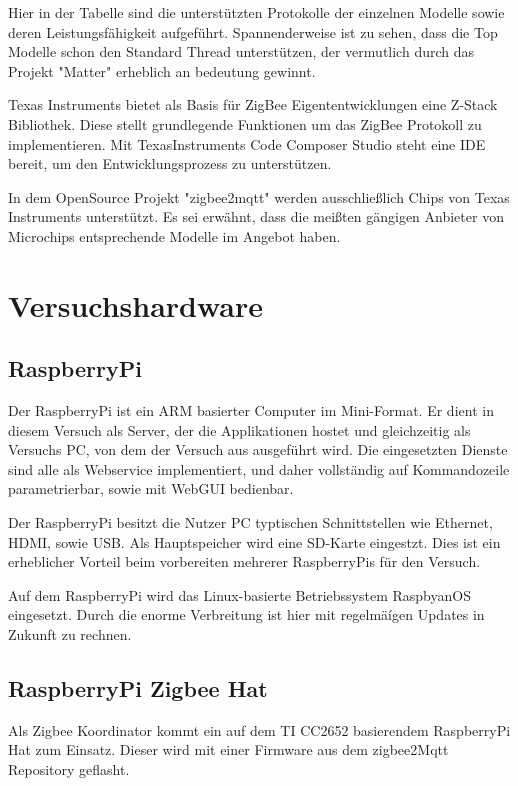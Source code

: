 Hier in der Tabelle sind die unterstützten Protokolle der einzelnen Modelle sowie deren Leistungsfähigkeit aufgeführt.
Spannenderweise ist zu sehen, dass die Top Modelle schon den Standard Thread unterstützen, der vermutlich durch das
Projekt "Matter" erheblich an bedeutung gewinnt.

Texas Instruments bietet als Basis für ZigBee Eigententwicklungen eine Z-Stack Bibliothek. Diese stellt grundlegende 
Funktionen um das ZigBee Protokoll zu implementieren. Mit TexasInstruments Code Composer Studio steht eine IDE bereit,
um den Entwicklungsprozess zu unterstützen.

In dem OpenSource Projekt "zigbee2mqtt" werden ausschließlich Chips von Texas Instruments unterstützt. Es sei erwähnt, 
dass die meißten gängigen Anbieter von Microchips entsprechende Modelle im Angebot haben. 

\section{Versuchshardware}

\subsection{RaspberryPi}

Der RaspberryPi ist ein ARM basierter Computer im Mini-Format. Er dient in diesem Versuch als Server, der die Applikationen
hostet und gleichzeitig als Versuchs PC, von dem der Versuch aus ausgeführt wird. Die eingesetzten Dienste sind alle
als Webservice implementiert, und daher vollständig auf Kommandozeile parametrierbar, sowie mit WebGUI bedienbar.

Der RaspberryPi besitzt die Nutzer PC typtischen Schnittstellen wie Ethernet, HDMI, sowie USB. Als Hauptspeicher wird eine
SD-Karte eingestzt. Dies ist ein erheblicher Vorteil beim vorbereiten mehrerer RaspberryPis für den Versuch.

Auf dem RaspberryPi wird das Linux-basierte Betriebssystem RaspbyanOS eingesetzt. Durch die enorme Verbreitung ist
hier mit regelmäígen Updates in Zukunft zu rechnen.

\subsection{RaspberryPi Zigbee Hat}

Als Zigbee Koordinator kommt ein auf dem TI CC2652 basierendem RaspberryPi Hat zum Einsatz. Dieser wird mit einer Firmware aus dem zigbee2Mqtt Repository
geflasht. 

